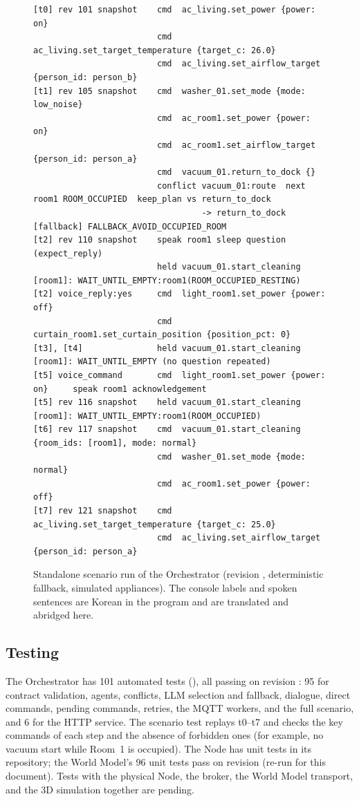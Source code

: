 \documentclass[conference]{IEEEtran}
\newcommand{\fld}[1]{\texttt{\detokenize{#1}}}
\begin{document}
\begin{figure}[!t]
\centering
\scriptsize
\begin{verbatim}
[t0] rev 101 snapshot    cmd  ac_living.set_power {power: on}
                         cmd  ac_living.set_target_temperature {target_c: 26.0}
                         cmd  ac_living.set_airflow_target {person_id: person_b}
[t1] rev 105 snapshot    cmd  washer_01.set_mode {mode: low_noise}
                         cmd  ac_room1.set_power {power: on}
                         cmd  ac_room1.set_airflow_target {person_id: person_a}
                         cmd  vacuum_01.return_to_dock {}
                         conflict vacuum_01:route  next room1 ROOM_OCCUPIED  keep_plan vs return_to_dock
                                  -> return_to_dock [fallback] FALLBACK_AVOID_OCCUPIED_ROOM
[t2] rev 110 snapshot    speak room1 sleep question (expect_reply)
                         held vacuum_01.start_cleaning [room1]: WAIT_UNTIL_EMPTY:room1(ROOM_OCCUPIED_RESTING)
[t2] voice_reply:yes     cmd  light_room1.set_power {power: off}
                         cmd  curtain_room1.set_curtain_position {position_pct: 0}
[t3], [t4]               held vacuum_01.start_cleaning [room1]: WAIT_UNTIL_EMPTY (no question repeated)
[t5] voice_command       cmd  light_room1.set_power {power: on}     speak room1 acknowledgement
[t5] rev 116 snapshot    held vacuum_01.start_cleaning [room1]: WAIT_UNTIL_EMPTY:room1(ROOM_OCCUPIED)
[t6] rev 117 snapshot    cmd  vacuum_01.start_cleaning {room_ids: [room1], mode: normal}
                         cmd  washer_01.set_mode {mode: normal}
                         cmd  ac_room1.set_power {power: off}
[t7] rev 121 snapshot    cmd  ac_living.set_target_temperature {target_c: 25.0}
                         cmd  ac_living.set_airflow_target {person_id: person_a}
\end{verbatim}
\caption{Standalone scenario run of the Orchestrator (revision
\fld{0ecf7bd}, deterministic fallback, simulated appliances). The
console labels and spoken sentences are Korean in the program and are
translated and abridged here.}
\label{fig:trace}
\end{figure}

\subsection{Testing}
\label{sec:impl-test}

The Orchestrator has 101 automated tests (\fld{pytest}), all passing
on revision \fld{0ecf7bd}: 95 for contract validation, agents,
conflicts, LLM selection and fallback, dialogue, direct commands,
pending commands, retries, the MQTT workers, and the full scenario,
and 6 for the HTTP service. The scenario test replays t0--t7 and
checks the key commands of each step and the absence of forbidden
ones (for example, no vacuum start while Room~1 is occupied). The
Node has unit tests in its repository; the World Model's 96 unit
tests pass on revision \fld{973ceb0} (re-run for this document). Tests with the physical Node, the broker, the
World Model transport, and the 3D simulation together are pending.
\end{document}
